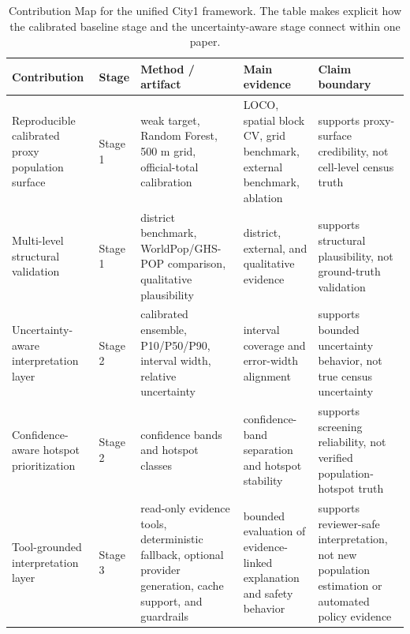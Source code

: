 \begin{table}[H]
\centering
\scriptsize
\caption{Contribution Map for the unified City1 framework. The table makes explicit how the calibrated baseline stage and the uncertainty-aware stage connect within one paper.}
\label{tab:contribution-map}
\begin{tabular}{p{3.0cm}p{1.2cm}p{3.0cm}p{3.0cm}p{3.8cm}}
\toprule
Contribution & Stage & Method / artifact & Main evidence & Claim boundary \\
\midrule
Reproducible calibrated proxy population surface & Stage 1 & weak target, Random Forest, 500 m grid, official-total calibration & LOCO, spatial block CV, grid benchmark, external benchmark, ablation & supports proxy-surface credibility, not cell-level census truth \\
Multi-level structural validation & Stage 1 & district benchmark, WorldPop/GHS-POP comparison, qualitative plausibility & district, external, and qualitative evidence & supports structural plausibility, not ground-truth validation \\
Uncertainty-aware interpretation layer & Stage 2 & calibrated ensemble, P10/P50/P90, interval width, relative uncertainty & interval coverage and error-width alignment & supports bounded uncertainty behavior, not true census uncertainty \\
Confidence-aware hotspot prioritization & Stage 2 & confidence bands and hotspot classes & confidence-band separation and hotspot stability & supports screening reliability, not verified population-hotspot truth \\
Tool-grounded interpretation layer & Stage 3 & read-only evidence tools, deterministic fallback, optional provider generation, cache support, and guardrails & bounded evaluation of evidence-linked explanation and safety behavior & supports reviewer-safe interpretation, not new population estimation or automated policy evidence \\
\bottomrule
\end{tabular}
\end{table}
